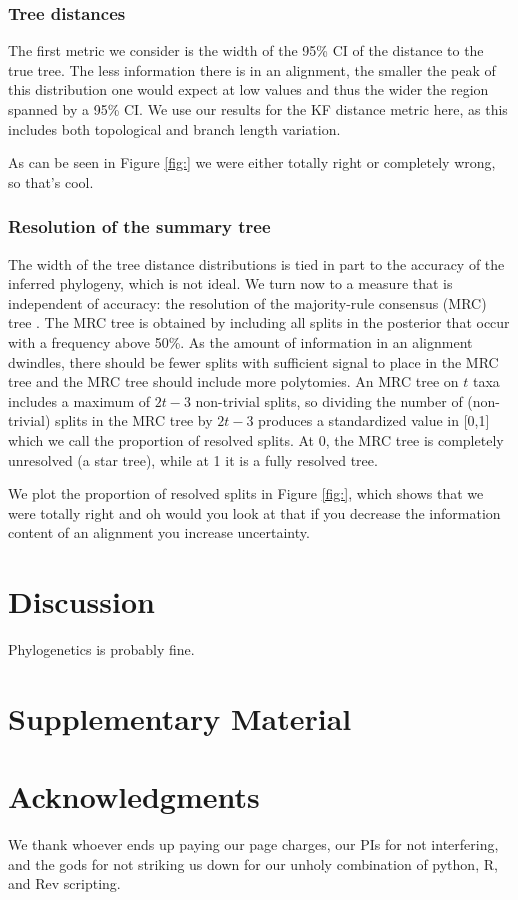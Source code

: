 \documentclass[11pt]{article}
\begin{document}
\subsubsection{Tree distances\label{sec:kf_variance}}
The first metric we consider is the width of the 95\% CI of the distance to the true tree.
The less information there is in an alignment, the smaller the peak of this distribution one would expect at low values and thus the wider the region spanned by a 95\% CI.
We use our results for the KF distance metric here, as this includes both topological and branch length variation.

As can be seen in Figure \ref{fig:} we were either totally right or completely wrong, so that's cool.

\subsubsection{Resolution of the summary tree\label{sec:MRC}}
The width of the tree distance distributions is tied in part to the accuracy of the inferred phylogeny, which is not ideal.
We turn now to a measure that is independent of accuracy: the resolution of the majority-rule consensus (MRC) tree \citep{}.
The MRC tree is obtained by including all splits in the posterior that occur with a frequency above 50\%.
As the amount of information in an alignment dwindles, there should be fewer splits with sufficient signal to place in the MRC tree and the MRC tree should include more polytomies.
An MRC tree on $t$ taxa includes a maximum of $2 t - 3$ non-trivial splits, so dividing the number of (non-trivial) splits in the MRC tree by $2 t - 3$ produces a standardized value in [0,1] which we call the proportion of resolved splits.
At 0, the MRC tree is completely unresolved (a star tree), while at 1 it is a fully resolved tree.

We plot the proportion of resolved splits in Figure \ref{fig:}, which shows that we were totally right and oh would you look at that if you decrease the information content of an alignment you increase uncertainty.

\section*{Discussion\label{sec:discussion}}

Phylogenetics is probably fine.

\section*{Supplementary Material}


\section*{Acknowledgments}
We thank whoever ends up paying our page charges, our PIs for not interfering, and the gods for not striking us down for our unholy combination of python, R, and Rev scripting.



\end{document}
